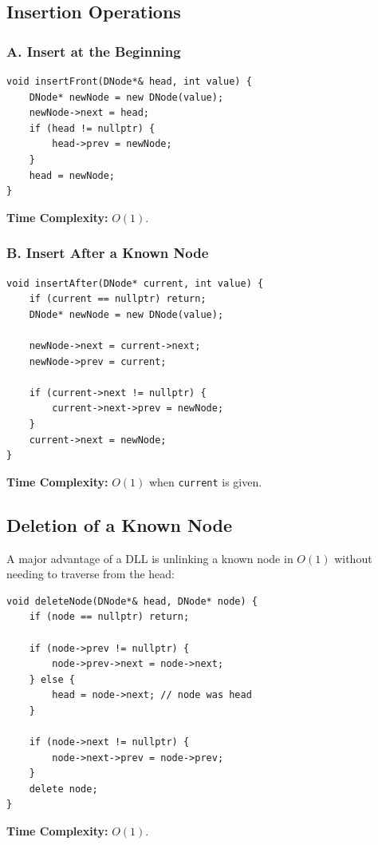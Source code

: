 \subsection{Insertion Operations}

\subsubsection{A. Insert at the Beginning}
\begin{lstlisting}[style=cppstyle]
void insertFront(DNode*& head, int value) {
    DNode* newNode = new DNode(value);
    newNode->next = head;
    if (head != nullptr) {
        head->prev = newNode;
    }
    head = newNode;
}
\end{lstlisting}
\textbf{Time Complexity:} $O(1)$.

\subsubsection{B. Insert After a Known Node}
\begin{lstlisting}[style=cppstyle]
void insertAfter(DNode* current, int value) {
    if (current == nullptr) return;
    DNode* newNode = new DNode(value);

    newNode->next = current->next;
    newNode->prev = current;

    if (current->next != nullptr) {
        current->next->prev = newNode;
    }
    current->next = newNode;
}
\end{lstlisting}
\textbf{Time Complexity:} $O(1)$ when \texttt{current} is given.

\subsection{Deletion of a Known Node}

A major advantage of a DLL is unlinking a known node in $O(1)$ without needing to traverse from the head:

\begin{lstlisting}[style=cppstyle]
void deleteNode(DNode*& head, DNode* node) {
    if (node == nullptr) return;

    if (node->prev != nullptr) {
        node->prev->next = node->next;
    } else {
        head = node->next; // node was head
    }

    if (node->next != nullptr) {
        node->next->prev = node->prev;
    }
    delete node;
}
\end{lstlisting}
\textbf{Time Complexity:} $O(1)$.

